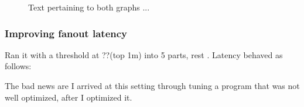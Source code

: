 \documentclass[11pt]{article}
\begin{document}
\begin{landscape}
\begin{figure}
\caption{Text pertaining to both graphs ...} \label{}

\end{figure}
\end{landscape}
\subsubsection{Improving fanout latency}

Ran it with a threshold at ??(top 1m) into 5 parts, rest .  Latency behaved as follows:

The bad news are I arrived at this setting through tuning a program that was not well optimized, after I optimized it.

\begin{figure}
  \begin{center}

\end{center}
\end{figure}
\end{document}
